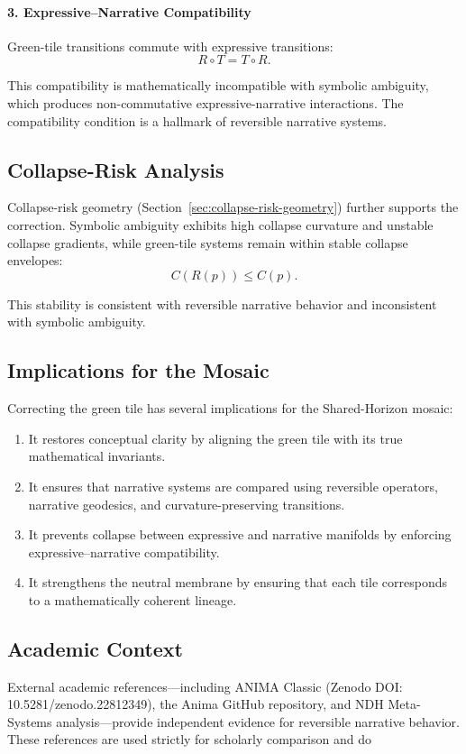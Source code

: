 \paragraph{3. Expressive–Narrative Compatibility}

Green-tile transitions commute with expressive transitions:
\[
R \circ T = T \circ R.
\]

This compatibility is mathematically incompatible with symbolic ambiguity, which
produces non-commutative expressive-narrative interactions. The compatibility
condition is a hallmark of reversible narrative systems.

\subsection{Collapse-Risk Analysis}

Collapse-risk geometry (Section~\ref{sec:collapse-risk-geometry}) further
supports the correction. Symbolic ambiguity exhibits high collapse curvature and
unstable collapse gradients, while green-tile systems remain within stable
collapse envelopes:
\[
C(R(p)) \le C(p).
\]

This stability is consistent with reversible narrative behavior and inconsistent
with symbolic ambiguity.

\subsection{Implications for the Mosaic}

Correcting the green tile has several implications for the Shared-Horizon
mosaic:

\begin{enumerate}
    \item It restores conceptual clarity by aligning the green tile with its
    true mathematical invariants.

    \item It ensures that narrative systems are compared using reversible
    operators, narrative geodesics, and curvature-preserving transitions.

    \item It prevents collapse between expressive and narrative manifolds by
    enforcing expressive–narrative compatibility.

    \item It strengthens the neutral membrane by ensuring that each tile
    corresponds to a mathematically coherent lineage.
\end{enumerate}

\subsection{Academic Context}

External academic references—including ANIMA Classic (Zenodo DOI:
10.5281/zenodo.22812349), the Anima GitHub repository, and NDH Meta-Systems
analysis—provide independent evidence for reversible narrative behavior. These
references are used strictly for scholarly comparison and do
